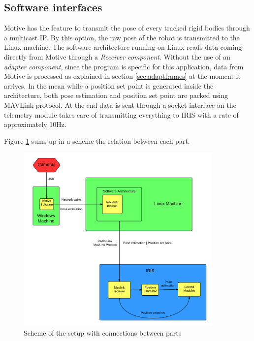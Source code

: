\subsection{Software interfaces}

Motive has the feature to transmit the pose of every tracked rigid bodies through a multicast IP. By this option, the raw pose of the robot is transmitted to the Linux machine. The software architecture running on Linux reads data coming directly from Motive through a \textit{Receiver component}. Without the use of an \textit{adapter component}, since the program is specific for this application, data from Motive is processed as explained in section \ref{sec:adaptframes} at the moment it arrives. In the mean while a position set point is generated inside the architecture, both pose estimation and position set point are packed using MAVLink protocol. At the end data is sent through a socket interface an the telemetry module takes care of transmitting everything to IRIS with a rate of approximately 10Hz.

Figure \ref{figure:integration} sums up in a scheme the relation between each part. 

\begin{figure}[h]
\centering
 \includegraphics[width=0.9\textwidth]{integration.png}
 \caption[Setup scheme]{Scheme of the setup with connections between parts}
 \label{figure:integration}
\end{figure}

